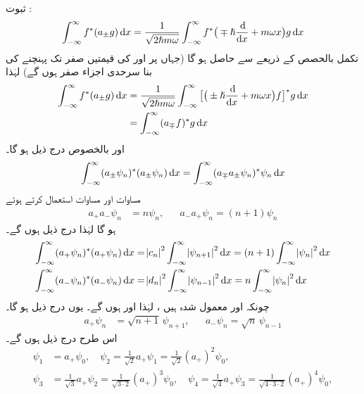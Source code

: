 ثبوت :
\begin{align*}
\int_{ - \infty}^{ \infty } f^*( a_{\pm}g ) \dif x = \frac{1}{ \sqrt{ 2 \hslash m \omega } } \int_{ - \infty }^{ \infty } f^*\big( \mp \hslash \frac{\dif}{\dif x} + m \omega x \big) g \dif x
\end{align*} 
تکمل بالحصص  کے ذریعے 
  سے  حاصل ہو گا  (جہاں  پر  اور  کی قیمتیں صفر تک پہنچنے کی بنا  سرحدی اجزاء صفر ہوں گے) لہٰذا 
\begin{align*}
\int_{ - \infty }^{ \infty } f^*( a_{\pm} g) \dif x &= \frac{1}{ \sqrt{ 2 \hslash m \omega } } \int_{ - \infty }^{ \infty } \big[ \big( \pm \hslash \frac{\dif}{\dif x} + m \omega x \big) f\big]^* g \dif x \\
&= \int_{ - \infty }^{ \infty } (a_\mp f )^* g \dif x
\end{align*}  
اور بالخصوص درج ذیل ہو گا۔
\begin{align*}
\int_{ - \infty }^{ \infty } ( a_\pm \psi_n )^*( a_\pm \psi_n ) \dif x = \int_{ - \infty }^{ \infty } ( a_\mp a_\pm \psi_n )^* \psi_n  \dif x
\end{align*}
 مساوات  اور مساوات  استعمال کرتے ہوئے 
\begin{align}\label{مساوات_شروڈنگر_سیڑھی_رفعت_تقلیل}
a_+ a_-  \psi_n &= n \psi_n , && a_- a_+ \psi_n = ( n+1 ) \psi_n 
\end{align}
ہو گا لہٰذا درج ذیل ہوں  گے۔ 
\begin{align*}
\int_{ - \infty }^{ \infty } ( a_+ \psi_n )^*( a_+ \psi_n ) \dif x &= \abs{c_n }^2 \int_{ - \infty }^{ \infty } \abs{ \psi_{n+1} }^2  \dif x  = ( n+1 ) \int_{ - \infty }^{ \infty } \abs{ \psi_n }^2 \dif x
\\
\int_{ - \infty }^{ \infty } ( a_- \psi_n )^*( a_- \psi_n ) \dif x &= \abs{ d_n }^2 \int_{ - \infty }^{ \infty } \abs{ \psi_{n-1} }^2  \dif x  =  n \int_{ - \infty }^{ \infty } \abs{ \psi_n }^2 \dif x
\end{align*}
چونکہ   اور   معمول شدہ ہیں ، لہٰذا  اور
 ہوں گے۔ یوں درج ذیل ہو گا۔
\begin{align}
a_+ \psi_n &= \sqrt{n+1} \,\psi_{n+1} ,&& a_- \psi_n = \sqrt{n} \,\psi_{n-1}
\end{align}
اس طرح درج ذیل ہوں گے۔
\begin{align*}
\psi_1 &= a_+ \psi_0 , \quad \psi_2 =\frac{1}{\sqrt{2}} a_+ \psi_1 = \frac{1}{ \sqrt{ 2 } } (a_+)^2 \psi_0,
\\
\psi_3 &= \frac{ 1 }{ \sqrt{ 3 } } a_+ \psi_2 = \frac{ 1 }{ \sqrt{3 \cdot 2} } ( a_+ )^3 \psi_0 ,\quad  \psi_4 = \frac{1}{ \sqrt{4} } a_+ \psi_3 =\frac{1}{ \sqrt{4 \cdot 3 \cdot 2} } ( a_+)^4 \psi_0,
\end{align*}
